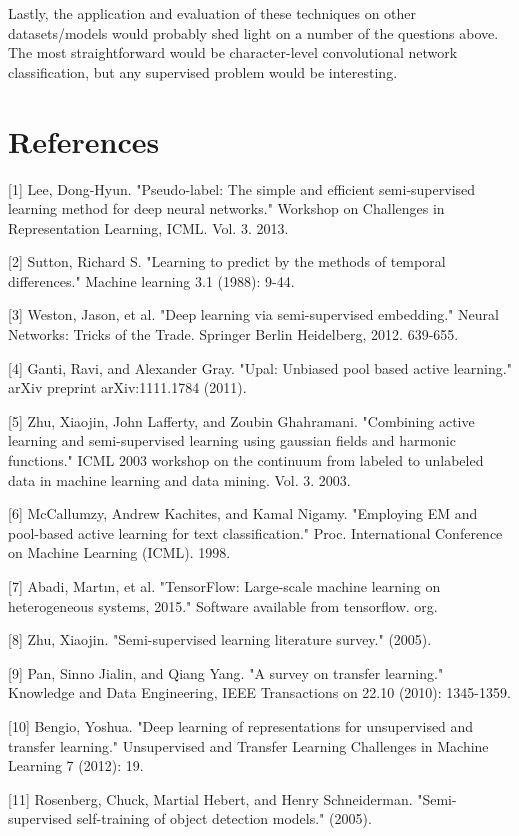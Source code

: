 \documentclass{article}
\begin{document}
Lastly, the application and evaluation of these techniques on other datasets/models would probably shed light on a number of the questions above.  The most straightforward would be character-level convolutional network classification, but any supervised problem would be interesting.  
\section*{References}

\small

[1] Lee, Dong-Hyun. "Pseudo-label: The simple and efficient semi-supervised learning method for deep neural networks." Workshop on Challenges in Representation Learning, ICML. Vol. 3. 2013.

[2] Sutton, Richard S. "Learning to predict by the methods of temporal differences." Machine learning 3.1 (1988): 9-44.

[3] Weston, Jason, et al. "Deep learning via semi-supervised embedding." Neural Networks: Tricks of the Trade. Springer Berlin Heidelberg, 2012. 639-655.

[4] Ganti, Ravi, and Alexander Gray. "Upal: Unbiased pool based active learning." arXiv preprint arXiv:1111.1784 (2011).

[5] Zhu, Xiaojin, John Lafferty, and Zoubin Ghahramani. "Combining active learning and semi-supervised learning using gaussian fields and harmonic functions." ICML 2003 workshop on the continuum from labeled to unlabeled data in machine learning and data mining. Vol. 3. 2003.

[6] McCallumzy, Andrew Kachites, and Kamal Nigamy. "Employing EM and pool-based active learning for text classification." Proc. International Conference on Machine Learning (ICML). 1998.

[7] Abadi, Martın, et al. "TensorFlow: Large-scale machine learning on heterogeneous systems, 2015." Software available from tensorflow. org.

[8] Zhu, Xiaojin. "Semi-supervised learning literature survey." (2005).

[9] Pan, Sinno Jialin, and Qiang Yang. "A survey on transfer learning." Knowledge and Data Engineering, IEEE Transactions on 22.10 (2010): 1345-1359.

[10] Bengio, Yoshua. "Deep learning of representations for unsupervised and transfer learning." Unsupervised and Transfer Learning Challenges in Machine Learning 7 (2012): 19.

[11] Rosenberg, Chuck, Martial Hebert, and Henry Schneiderman. "Semi-supervised self-training of object detection models." (2005).
\end{document}
